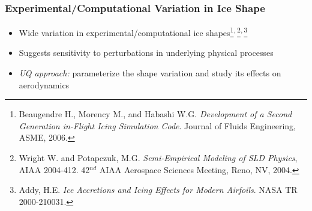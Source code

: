 \documentclass[9pt]{beamer}
\begin{document}
\begin{frame}
\frametitle{Experimental/Computational Variation in Ice Shape}
\label{sec-1-2}


\vspace*{-0.5cm}\begin{figure}
  \begin{subfigmatrix}{3}
  \end{subfigmatrix}
\end{figure}

\begin{itemize}
\item Wide variation in experimental/computational ice shapes\footnote{Beaugendre H., Morency M., and Habashi W.G. \emph{Development of a Second Generation in-Flight Icing Simulation Code}. Journal of
Fluids Engineering, ASME, 2006.
 }\textsuperscript{,}\,\footnote{Wright W. and Potapczuk, M.G. \emph{Semi-Empirical Modeling of SLD Physics}, AIAA 2004-412. 42$^{nd}$ AIAA Aerospace Sciences
Meeting, Reno, NV, 2004.
 }\textsuperscript{,}\,\footnote{Addy, H.E. \emph{Ice Accretions and Icing Effects for Modern Airfoils}. NASA TR 2000-210031.
 }
\item Suggests sensitivity to perturbations in underlying physical
  processes
\item \emph{UQ approach:} parameterize the shape variation and study its
  effects on aerodynamics
\end{itemize}
\end{frame}
\end{document}
